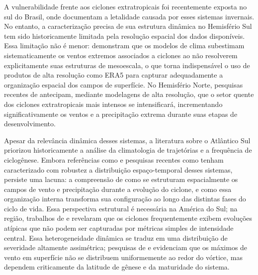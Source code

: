 
A vulnerabilidade frente aos ciclones extratropicais foi recentemente exposta no sul do Brasil, onde \citet{bartolomei2024extremos} documentam a letalidade causada por esses sistemas invernais. No entanto, a caracterização precisa de sua estrutura dinâmica no Hemisfério Sul tem sido historicamente limitada pela resolução espacial dos dados disponíveis. Essa limitação não é menor: \citet{priestley2022improved} demonstram que os modelos de clima subestimam sistematicamente os ventos extremos associados a ciclones ao não resolverem explicitamente suas estruturas de mesoescala, o que torna indispensável o uso de produtos de alta resolução como ERA5 para capturar adequadamente a organização espacial dos campos de superfície. No Hemisfério Norte, pesquisas recentes de \citet{gentile2025response} antecipam, mediante modelagens de alta resolução, que o setor quente dos ciclones extratropicais mais intensos se intensificará, incrementando significativamente os ventos e a precipitação extrema durante suas etapas de desenvolvimento.

Apesar da relevância dinâmica desses sistemas, a literatura sobre o Atlântico Sul priorizou historicamente a análise da climatologia de trajetórias e a frequência de ciclogênese. Embora referências como \citet{gramcianinov2020analysis} e pesquisas recentes como \citet{padilhareinke2026characterization} tenham caracterizado com robustez a distribuição espaço-temporal desses sistemas, persiste uma lacuna: a compreensão de como se estruturam espacialmente os campos de vento e precipitação durante a evolução do ciclone, e como essa organização interna transforma sua configuração ao longo das distintas fases do ciclo de vida. Essa perspectiva estrutural é necessária na América do Sul; na região, trabalhos de \citet{gozzo2013air} e \citet{reboita2022from} revelaram que os ciclones frequentemente exibem evoluções atípicas que não podem ser capturadas por métricas simples de intensidade central. Essa heterogeneidade dinâmica se traduz em uma distribuição de severidade altamente assimétrica; pesquisas de \citet{bitencourt2010relating} e \citet{cardoso2022synoptic} evidenciam que os máximos de vento em superfície não se distribuem uniformemente ao redor do vórtice, mas dependem criticamente da latitude de gênese e da maturidade do sistema.

